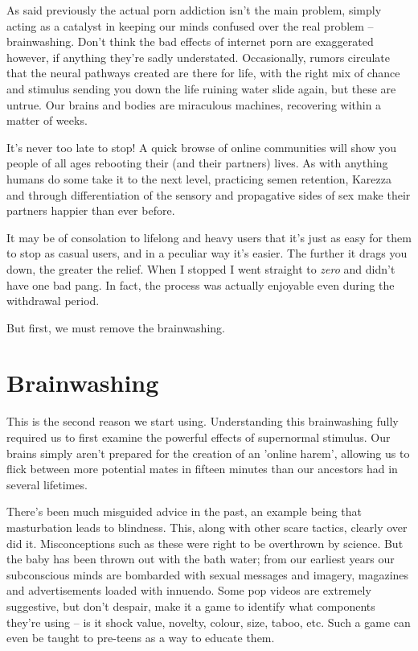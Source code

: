 \documentclass[
]{book}
\begin{document}
As said previously the actual porn addiction isn't the main problem, simply acting as a catalyst in keeping our minds confused over the real problem -- brainwashing. Don't think the bad effects of internet porn are exaggerated however, if anything they're sadly understated. Occasionally, rumors circulate that the neural pathways created are there for life, with the right mix of chance and stimulus sending you down the life ruining water slide again, but these are untrue. Our brains and bodies are miraculous machines, recovering within a matter of weeks.

It's never too late to stop! A quick browse of online communities will show you people of all ages rebooting their (and their partners) lives. As with anything humans do some take it to the next level, practicing semen retention, Karezza and through differentiation of the sensory and propagative sides of sex make their partners happier than ever before.

It may be of consolation to lifelong and heavy users that it's just as easy for them to stop as casual users, and in a peculiar way it's easier. The further it drags you down, the greater the relief. When I stopped I went straight to \emph{zero} and didn't have one bad pang. In fact, the process was actually enjoyable even during the withdrawal period.

But first, we must remove the brainwashing.

\hypertarget{brainwashing}{%
\chapter{Brainwashing}\label{brainwashing}}

This is the second reason we start using. Understanding this brainwashing fully required us to first examine the powerful effects of supernormal stimulus. Our brains simply aren't prepared for the creation of an 'online harem', allowing us to flick between more potential mates in fifteen minutes than our ancestors had in several lifetimes.

There's been much misguided advice in the past, an example being that masturbation leads to blindness. This, along with other scare tactics, clearly over did it. Misconceptions such as these were right to be overthrown by science. But the baby has been thrown out with the bath water; from our earliest years our subconscious minds are bombarded with sexual messages and imagery, magazines and advertisements loaded with innuendo. Some pop videos are extremely suggestive, but don't despair, make it a game to identify what components they're using -- is it shock value, novelty, colour, size, taboo, etc. Such a game can even be taught to pre-teens as a way to educate them.
\end{document}
